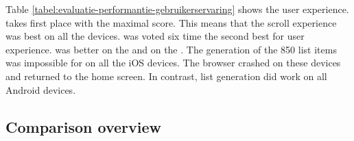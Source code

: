 \documentclass[a4paper]{artikel3}
\newcommand{\setspace}[0]{\vspace{2mm}}
\renewcommand{\paragraph}[1]{\setspace \noindent {\bf #1}  }
\begin{document}
\paragraph{User experience}
Table \ref{tabel:evaluatie-performantie-gebruikerservaring} shows the user experience.
\sta{} takes first place with the maximal score.
This means that the scroll experience was best on all the devices.
\jqma{} was voted six time the second best for user experience.
\kendoa{} was better on the \htc{} and \lungo{} on the \ipadiii{}.
The generation of the 850 list items was impossible for \kendoa{} on all the iOS devices.
The browser crashed on these devices and returned to the home screen.
In contrast, list generation did work on all Android devices.

\begin{table}
\centering
{}
\caption{User experience for \st{}~(\sta), \kendo{}~(\kendoa), \jqm{}~(\jqma) en \lungo{}~(\lungoa).}
\label{tabel:evaluatie-performantie-gebruikerservaring}
\end{table}


\subsection{Comparison overview} %
\label{sec:evaluation-overview}
\end{document}
